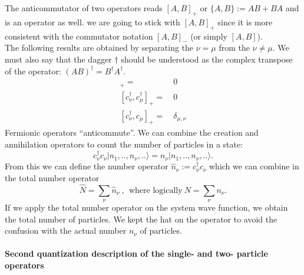 \documentclass[../main.tex]{subfile}
\begin{document}
The anticommutator of two operators reads $[A,B]_{+}$ or $\{A,B\} := AB + BA$ and is an operator as well.
we are going to stick with $[A,B]_{+}$ since it is more consistent with the commutator notation $[A,B]_{-}$ (or simply $[A,B]$).\\

The following results are obtained by separating the $\nu = \mu$ from the $\nu \neq \mu$. We must also say that the dagger $\dagger$ 
should be understood as the complex transpose of the operator: $(AB)^{\dagger} = B^{\dagger}A^{\dagger}$.
\begin{align}
    [c_{\nu},c_{\mu}]_+ =&~ 0 \label{eq:Fermion1} \\
    [c^{\dagger}_{\nu},c^{\dagger}_{\mu}]_+ =&~0 \label{eq:Fermion2} \\
    [c^{\dagger}_{\nu},c_{\mu}]_+ =&~ \delta_{\mu,\nu}\label{eq:Fermion3} 
\end{align} 
Fermionic operators ``anticommute''.
We can combine the creation and annihilation operators to count the number of particles in a state:
\[
    c_{\nu}^{\dagger} c_{\nu} |n_{1},..,n_{\nu},..\rangle = n_{\nu}|n_{1},..,n_{\nu},..\rangle.
\]  
From this we can define the number operator $\hat{n}_{\nu}:= c_{\nu}^{\dagger} c_{\nu}$ which we can combine in the total number operator
\[
    \hat{N} = \sum_{\nu} \hat{n}_{\nu}~,~~\text{where logically}~ N = \sum_{\nu} n_{\nu}.
\]
If we apply the total number operator on the system wave function, we obtain the total number of particles.
We kept the hat on the operator to avoid the confusion with the actual number $n_{\nu}$ of particles.\\

\paragraph{Second quantization description of the single- and two- particle operators}$~$\\
\end{document}
